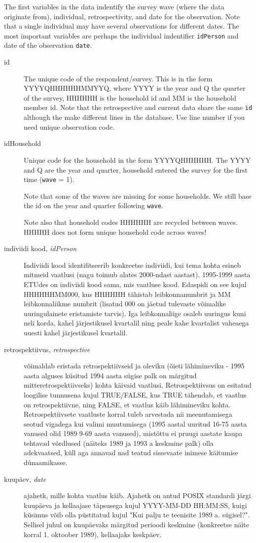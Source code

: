 \documentclass[a4paper]{article}
\begin{document}
The first variables in the data indentify the survey wave (where the
data originate from), individual, retrospectivity, and date for the
observation.  Note that a single individual may have several
observations for different dates.  The most important variables are
perhaps the individual indentifier \verb|idPerson| and date of the
observation \verb|date|.
\begin{description}
\item[id] The unique code of the respondent/survey.  This is in the
  form YYYYQHHHHHHMMYYQ, where YYYY is the year and Q the quarter of
  the survey, HHHHHH is the household id and MM is the household
  member id.  Note that the retrospective and current data share the
  same \texttt{id} although the make different lines in the database.
  Use line number if you need unique observation code.
\item[idHousehold] Unique code for the household in the form
  YYYYQHHHHHH.  The YYYY and Q are the year and quarter, household
  entered the survey for the first time (\texttt{wave} = 1).

  Note that some of the waves are missing for some households.  We
  still base the id on the year and quarter following \texttt{wave}.

  Note also that household codes HHHHHH are recycled between waves.
  HHHHH does not form unique household code across waves!
\item[indiviidi kood, \textit{idPerson}] Indiviidi kood
  identifitseerib konkreetse indiviidi, kui tema kohta esineb mitmeid
  vaatlusi (nagu toimub alates 2000-ndast aastast). 1995-1999 aasta ETUdes on
  indiviidi kood sama, mis vaatluse kood. Edaspidi on see kujul HHHHHHMM000, kus
  HHHHHH tähistab leibkonnanumbrit ja MM leibkonnaliikme numbrit (lisatud 000 on
  jäetud tulevaste võimalike uuringulainete eristamiste tarvis). Iga
  leibkonnaliige osaleb uuringus kuni neli korda, kahel järjestikusel kvartalil
  ning peale kahe kvartalist vaheaega uuesti kahel järjestikusel kvartalil.
\item[retrospektiivus, \textit{retrospective}] võimaldab eristada
  retrospektiivseid ja oleviku (õieti lähimineviku - 1995 aasta alguses küsitud
  1994 aasta sügise palk on märgitud mitteretrospektiivseks) kohta käivaid
  vaatlusi. Retrospektiivsus on esitatud loogilise tunnusena kujul TRUE/FALSE, kus
  TRUE tähendab, et vaatlus on retrospektiivne, ning FALSE, et
  vaatlus käib lähimineviku kohta. Retrospektiivsete vaatluste korral tuleb
  arvestada nii meenutamisega seotud vigadega kui valimi muutumisega (1995 aastal
  uuritud 16-75 aasta vanused olid 1989 9-69 aasta vanused), mistõttu ei pruugi
  aastate kaupa tehtavad võrdlused (näiteks 1989 ja 1993 a keskmine palk) olla
  adekvaatsed, küll aga annavad nad teatud sissevaate inimese käitumise
  dünaamikasse.
\item[kuupäev, \textit{date}] ajahetk, mille kohta vaatlus käib. Ajahetk on
  antud POSIX standardi järgi kuupäeva ja kellaajase täpsusega kujul YYYY-MM-DD
  HH:MM:SS, kuigi küsimus võib olla püstitatud kujul "Kui palju te teenisite 1989
  a. sügisel?". Sellisel juhul on kuupäevaks märgitud perioodi keskmine
  (konkreetse näite korral 1. oktoober 1989), kellaajaks keskpäev.
\end{description}
\end{document}
